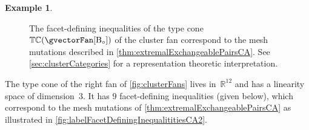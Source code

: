 \documentclass{amsart}
\theoremstyle{definition}
\newtheorem{example}[theorem]{Example}
\newcommand{\R}{\mathbb{R}} %
\newcommand{\typeCone}{\mathbb{TC}} %
\newcommand{\B}{\mathrm{B}} %
\begin{document}
\begin{example}
\begin{figure}[h]
\begin{adjustbox}{center}
    \end{adjustbox}
	\caption{The facet-defining inequalities of the type cone~$\typeCone(\gvectorFan[\B_\circ])$ of the cluster fan correspond to the mesh mutations described in \cref{thm:extremalExchangeablePairsCA}. See \cref{sec:clusterCategories} for a representation theoretic \mbox{interpretation}.}
	\label{fig:labelFacetDefiningInequalititiesCA1}
\end{figure}

\noindent
The type cone of the right fan of \cref{fig:clusterFans} lives in~$\R^{12}$ and has a linearity space of dimension~$3$.
It has $9$ facet-defining inequalities (given below), which correspond to the mesh mutations of \cref{thm:extremalExchangeablePairsCA} as illustrated in \cref{fig:labelFacetDefiningInequalititiesCA2}.


\end{example}
\end{document}
